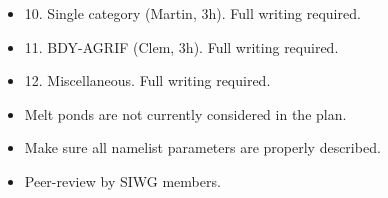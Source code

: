 \documentclass[../../tex_main/NEMO_manual]{subfiles}
\begin{document}
\begin{itemize}
\item 10. Single category (Martin, 3h). Full writing required.

\item 11. BDY-AGRIF (Clem, 3h). Full writing required.

\item 12. Miscellaneous. Full writing required.

\item Melt ponds are not currently considered in the plan.

\item Make sure all namelist parameters are properly described.

\item Peer-review by SIWG members.

\end{itemize}
\end{document}
